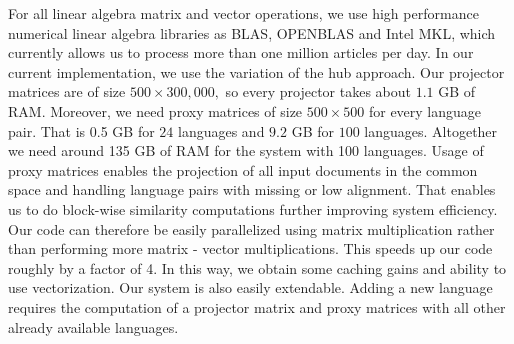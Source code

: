 For all linear algebra matrix and vector operations, we use high performance numerical
linear algebra libraries as BLAS, OPENBLAS and Intel MKL, which currently allows
us to process more than one million articles per day.
In our current implementation, we use the variation of the hub approach. Our projector
matrices are of size $500\times 300,000,$ so every projector takes about $1.1$ GB of RAM.
Moreover, we need proxy matrices of size $500\times500$ for every language pair. That
is 0.5 GB for $24$ languages and $9.2$ GB for $100$ languages. Altogether we need
around 135 GB of RAM for the system with 100 languages.
Usage of proxy matrices enables the projection of all input documents in the common
space and handling language pairs with missing or low alignment. That enables us to
do block-wise similarity computations further improving system efficiency. Our code
can therefore be easily parallelized using matrix multiplication rather than performing
more matrix - vector multiplications. This speeds up our code roughly by a factor of 4. In
this way, we obtain some caching gains and ability to use vectorization.
Our system is also easily extendable. Adding a new language requires the computation of
a projector matrix and proxy matrices with all other already available languages. 